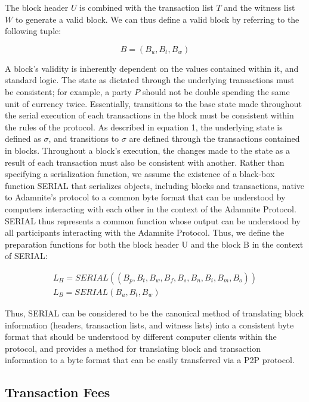 \documentclass[conference]{IEEEtran}
\begin{document}
The block header $U$ is combined with the transaction list $T$ and the witness list $W$ to generate a valid block. We can thus define a valid block by referring to the following tuple:

\begin{equation}
{B} = (B_{u}, B_{t}, B_{w})
\end{equation}

A block's validity is inherently dependent on the values contained within it, and standard logic. The state as dictated through the underlying transactions must be consistent; for example, a party $P$ should not be double spending the same unit of currency twice. Essentially, transitions to the base state made throughout the serial execution of each transactions in the block must be consistent within the rules of the protocol. As described in equation 1, the underlying state is defined as $\sigma$, and transitions to $\sigma$ are defined through the transactions contained in blocks. Throughout a block's execution, the changes made to the state as a result of each transaction must also be consistent with another.
Rather than specifying a serialization function, we assume the existence of a black-box function SERIAL that serializes objects, including blocks and transactions, native to Adamnite's protocol to a common byte format that can be understood by computers interacting with each other in the context of the Adamnite Protocol. SERIAL thus represents a common function whose output can be understood by all participants interacting with the Adamnite Protocol. Thus, we define the preparation functions for both the block header U and the block B in the context of SERIAL:

\begin{eqnarray}
{L_{H} = SERIAL((B_p,B_t,B_w,B_f,B_s,B_n,B_i,B_m,B_o))}\\
{L_{B}} = SERIAL(B_{u},B_{t},B_{w})
\end{eqnarray}


Thus, SERIAL can be considered to be the canonical method of translating block information (headers, transaction lists, and witness lists) into a consistent byte format that should be understood by different computer clients within the protocol, and provides a method for translating block and transaction information to a byte format that can be easily transferred via a P2P protocol.


\subsection{Transaction Fees}
\end{document}
